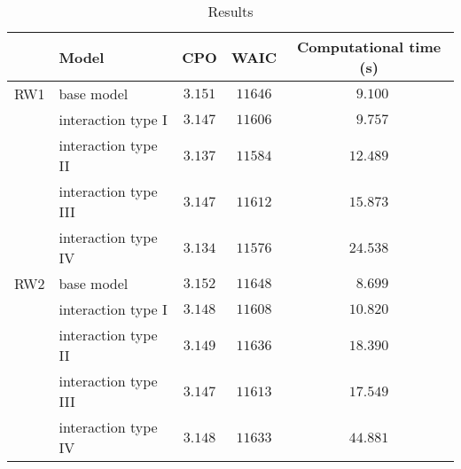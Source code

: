 \begin{table}

\caption{\label{tab:tab:all-results}Results}
\centering
\begin{tabular}{llccc}
\hline
 & Model & CPO & WAIC & \multicolumn{1}{c}{Computational time (s)} \\ 
\hline
\nopagebreak RW1 & base model  & $3.151$ & $11646$ & $\phantom{0}9.100$ \\
 & interaction type I  & $3.147$ & $11606$ & $\phantom{0}9.757$ \\
 & interaction type II  & $3.137$ & $11584$ & $12.489$ \\
 & interaction type III  & $3.147$ & $11612$ & $15.873$ \\
 & interaction type IV  & $3.134$ & $11576$ & $24.538$ \\
\nopagebreak RW2 & base model  & $3.152$ & $11648$ & $\phantom{0}8.699$ \\
 & interaction type I  & $3.148$ & $11608$ & $10.820$ \\
 & interaction type II  & $3.149$ & $11636$ & $18.390$ \\
 & interaction type III  & $3.147$ & $11613$ & $17.549$ \\
 & interaction type IV  & $3.148$ & $11633$ & $44.881$ \\
\hline 
\end{tabular}


\end{table}